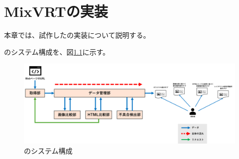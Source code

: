 \chapter{MixVRTの実装}\label{cha:Implementation}
本章では、試作した\toolName の実装について説明する。
\par
\toolName のシステム構成を、図\ref{fig:System}に示す。
\begin{figure}[tp]
    \begin{center}
        \includegraphics[width=1.0\columnwidth]{image/4_System_4.png}
        \caption{\toolName のシステム構成}
        \label{fig:System}
    \end{center}
\end{figure}
